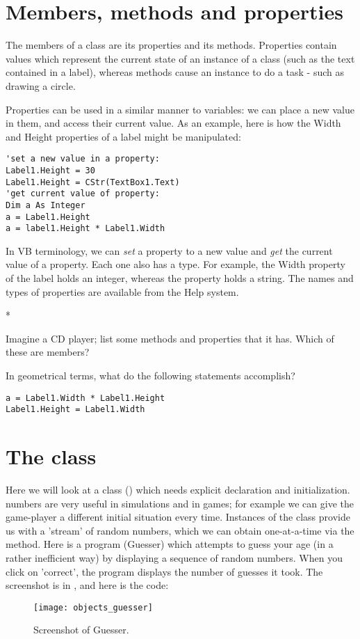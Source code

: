   \section{Members, methods and properties}
		The members of a class are its properties and its methods. Properties contain values which represent the current state of an instance of a class (such as the text contained in a label), whereas methods cause an instance to do a task - such as drawing a circle.
		
		Properties can be used in a similar manner to variables: we can place a new value in them, and access their current value. As an example, here is how the Width and Height properties of a label might be manipulated:
		\begin{lstlisting}
'set a new value in a property:
Label1.Height = 30
Label1.Height = CStr(TextBox1.Text)
'get current value of property:
Dim a As Integer
a = Label1.Height
a = label1.Height * Label1.Width
		\end{lstlisting}
		In VB terminology, we can \emph{set} a property to a new value and \emph{get} the current value of a property. Each one also has a type. For example, the Width property of the label holds an integer, whereas the  property holds a string. The names and types of properties are available from the Help system.


		\begin{stqb}*
			\begin{STQ}
				\item	Imagine a CD player; list some methods and properties that it has. Which of these are members?
				\item In geometrical terms, what do the following statements accomplish?
					\begin{lstlisting}
a = Label1.Width * Label1.Height
Label1.Height = Label1.Width
					\end{lstlisting}
			\end{STQ}
		\end{stqb}
  

	\section{The  class}
	Here we will look at a class () which needs explicit declaration and initialization.  numbers are very useful in simulations and in games; for example we can give the game-player a different initial situation every time. Instances of the  class provide us with a 'stream' of random numbers, which we can obtain one-at-a-time via the  method. Here is a program (Guesser) which attempts to guess your age (in a rather inefficient way) by displaying a sequence of random numbers. When you click on 'correct', the program displays the number of guesses it took. The screenshot is in , and here is the code:
		\begin{figure}[ht]
			\centering
			\texttt{[image: objects\_guesser]}
			\caption{Screenshot of Guesser.}
			\label{fig:objects_guesser}
		\end{figure}

